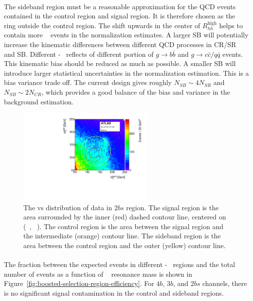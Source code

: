 \paragraph{}
The sideband region must be a reasonable approximation for the QCD events contained in the control region and signal region.
It is therefore chosen as the ring outside the control region.
The shift upwards in the center of $R_{hh}^{\text{high}}$ helps to contain more \ttbar~ events in the normalization estimates.
A larger SB will potentially increase the kinematic differences between different QCD processes in CR/SR and SB.
Different \mleadJ-\msublJ~ reflects of different portion of $g \to b\bar{b}$ and $g \to c\bar{c}/q\bar{q}$ events.
This kinematic bias should be reduced as much as possible.
A smaller SB will introduce larger statistical uncertainties in the normalization estimation.
This is a bias variance trade off.
The current design gives roughly $N_{SB} \sim 4 N_{SR}$ and $N_{SB} \sim 2 N_{CR}$, which provides a good balance of the bias and variance in the background estimation.

\begin{figure}[htb!]
\begin{center}
  \includegraphics[width=0.6\textwidth,angle=-90]{figures/boosted/Other/TwoTag_split_Incl_data_mH0H1.pdf}
  \caption{The \mleadJ vs \msublJ distribution of data in $2bs$ region. The signal region is the area surrounded by the inner (red) dashed contour line, centered on (~\GeV, ~\GeV). The control region is the area between the signal region and the intermediate (orange) contour line. The sideband region is the area between the control region and the outer (yellow) contour line.}
  \label{fig:boosted-region-def}
\end{center}
\end{figure}

\paragraph{}
The fraction between the expected events in different \mleadJ-\msublJ~ regions and the total number of events as a function of \Grav~ resonance mass is shown in Figure~\ref{fig:boosted-selection-region-efficiency}. 
For $4b$, $3b$, and $2bs$ channels, there is no significant signal contamination in the control and sideband regions.



